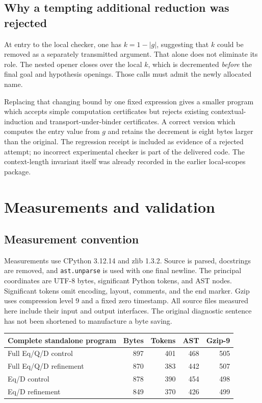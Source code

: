 \documentclass[11pt,letterpaper]{article}
\theoremstyle{definition}
\theoremstyle{remark}
\begin{document}
\subsection{Why a tempting additional reduction was rejected}
At entry to the local checker, one has $k=1-\lvert g\rvert$, suggesting
that $k$ could be removed as a separately transmitted argument. That alone
does not eliminate its role. The nested opener closes over the local $k$,
which is decremented \emph{before} the final goal and hypothesis openings.
Those calls must admit the newly allocated name.

Replacing that changing bound by one fixed expression gives a smaller
program which accepts simple computation certificates but rejects existing
contextual-induction and transport-under-binder certificates. A correct
version which computes the entry value from $g$ and retains the decrement
is eight bytes larger than the original. The regression receipt is included
as evidence of a rejected attempt; no incorrect experimental checker is
part of the delivered code. The context-length invariant itself was already
recorded in the earlier local-scopes package.

\clearpage
\section{Measurements and validation}
\label{sec:measurements}
\subsection{Measurement convention}
Measurements use CPython 3.12.14 and zlib 1.3.2. Source is parsed, docstrings
are removed, and \texttt{ast.unparse} is used with one final newline. The
principal coordinates are UTF-8 bytes, significant Python tokens, and AST
nodes. Significant tokens omit encoding, layout, comments, and the end
marker. Gzip uses compression level 9 and a fixed zero timestamp. All source
files measured here include their input and output interfaces. The original
diagnostic sentence has not been shortened to manufacture a byte saving.

\begin{center}
\begin{tabular}{lrrrr}
\toprule
Complete standalone program & Bytes & Tokens & AST & Gzip-9\\
\midrule
Full Eq/Q/D control & 897 & 401 & 468 & 505\\
Full Eq/Q/D refinement & 870 & 383 & 442 & 507\\
Eq/D control & 878 & 390 & 454 & 498\\
Eq/D refinement & 849 & 370 & 426 & 499\\
\bottomrule
\end{tabular}
\end{center}
\end{document}
